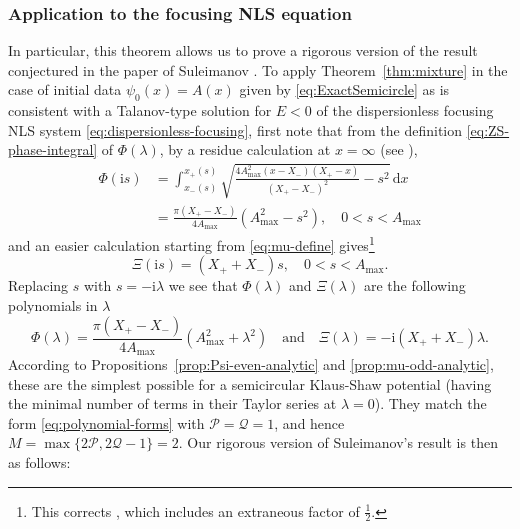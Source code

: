\documentclass[12pt]{amsart}
\numberwithin{equation}{section}
\newcommand{\dd}{\mathrm{d}}
\newcommand{\ii}{\mathrm{i}}
\newcommand{\SP}{\lambda}
\newcommand{\phaseint}{\Phi}
\newcommand{\tailint}{\Xi}
\begin{document}
\subsubsection{Application to the focusing NLS equation}
In particular, this theorem allows us to prove a rigorous version of the result conjectured in the paper of Suleimanov \cite{Suleimanov17}.  To apply Theorem~\ref{thm:mixture} in the case of initial data $\psi_0(x)=A(x)$ given by \eqref{eq:ExactSemicircle} as is consistent with a Talanov-type solution for $E<0$ of the dispersionless focusing NLS system \eqref{eq:dispersionless-focusing}, first note that from the definition  \eqref{eq:ZS-phase-integral} of $\phaseint(\SP)$, by a residue calculation at $x=\infty$ (see \cite[Eqn.\@ (4.27)]{Buckingham:2016}),
\begin{equation}
\begin{split}
\phaseint(\ii s)&=\int_{x_-(s)}^{x_+(s)}\sqrt{\frac{4A_\mathrm{max}^2(x-X_-)(X_+-x)}{(X_+-X_-)^2}-s^2}\,\dd x\\ &=\frac{\pi(X_+-X_-)}{4A_\mathrm{max}}(A_\mathrm{max}^2-s^2),\quad 0<s<A_\mathrm{max}
\end{split}
\label{eq:semicircle-Psi}
\end{equation}
and an easier calculation starting from \eqref{eq:mu-define} gives\footnote{This corrects \cite[Eqn.\@ (4.29)]{Buckingham:2016}, which includes an extraneous factor of $\frac{1}{2}$.}
\begin{equation}
\tailint(\ii s)=(X_++X_-)s,\quad 0<s<A_\mathrm{max}.
\label{eq:semicircle-mu}
\end{equation}
Replacing $s$ with $s=-\ii\SP$ we see that $\phaseint(\SP)$ and $\tailint(\SP)$ are the following polynomials in $\SP$
\begin{equation}
\phaseint(\SP)=\frac{\pi(X_+-X_-)}{4A_\mathrm{max}}(A_\mathrm{max}^2+\SP^2)\quad\text{and}\quad
\tailint(\SP)=-\ii(X_++X_-)\SP.
\label{eq:Psi-mu-polynomials}
\end{equation}
According to Propositions~\ref{prop:Psi-even-analytic} and \ref{prop:mu-odd-analytic}, these are the simplest possible for a semicircular Klaus-Shaw potential (having the minimal number of terms in their Taylor series at $\SP=0$).  They match the form \eqref{eq:polynomial-forms} with $\mathcal{P}=\mathcal{Q}=1$, and hence $M=\max\{2\mathcal{P},2\mathcal{Q}-1\}=2$.  Our rigorous version of Suleimanov's result \cite{Suleimanov17} is then as follows:
\end{document}
